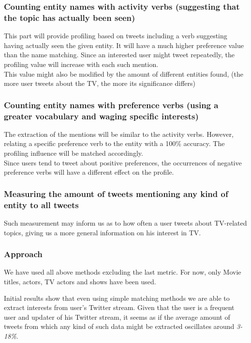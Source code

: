 \subsubsection{Counting entity names with activity verbs (suggesting that the topic has
    actually been seen)}

This part will provide profiling based on tweets including a verb suggesting
having actually seen the given entity. It will have a much higher preference
value than the name matching. Since an interested user might tweet repeatedly,
the profiling value will increase with each such mention. \\
This value might also be modified by the amount of different entities found,
(the more user tweets about the TV, the more its significance differs)

\subsubsection{Counting entity names with preference verbs (using a greater vocabulary
      and waging specific interests)}

The extraction of the mentions will be similar to the activity verbs. However,
relating a specific preference verb to the entity with a 100\% accuracy. The
profiling influence will be matched accordingly. \\
Since users tend to tweet about positive preferences, the occurrences of negative
preference verbs will have a different effect on the profile.

\subsubsection{Measuring the amount of tweets mentioning any kind of entity to all
  tweets}

Such measurement may inform us as to how often a user tweets about TV-related
topics, giving us a more general information on his interest in TV.

\subsubsection{Approach}
We have used all above methods excluding the last metric. For now, only Movie titles, actors,
TV actors and shows have been used.

Initial results show that even using simple matching methods we are able to extract interests from
user's Twitter stream. Given that the user is a frequent user and updater of his Twitter stream, it seems
as if the average amount of tweets from which any kind of such data might be extracted oscillates around \textit{3-18\%}.

